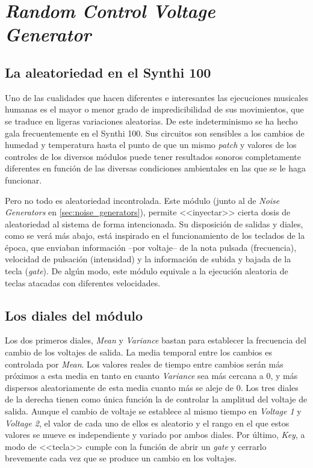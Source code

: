 \section[Random C. V. Generator]{\textit{Random Control Voltage Generator}}
\label{sec:random_generator}

\subsection{La aleatoriedad en el Synthi 100}
Uno de las cualidades que hacen diferentes e interesantes las ejecuciones musicales humanas es el mayor o menor grado de impredicibilidad de sus movimientos, que se traduce en ligeras variaciones aleatorias. De este indeterminismo se ha hecho gala frecuentemente en el Synthi 100. Sus circuitos son sensibles a los cambios de humedad y temperatura hasta el punto de que un mismo \textit{patch} y valores de los controles de los diversos módulos puede tener resultados sonoros completamente diferentes en función de las diversas condiciones ambientales en las que se le haga funcionar. 

Pero no todo es aleatoriedad incontrolada. Este módulo (junto al de \textit{Noise Generators} en \ref{sec:noise_generators}), permite <<inyectar>> cierta dosis de aleatoriedad al sistema de forma intencionada. Su disposición de salidas y diales, como se verá más abajo, está inspirado en el funcionamiento de los teclados de la época, que enviaban información --por voltaje-- de la nota pulsada (frecuencia), velocidad de pulsación (intensidad) y la información de subida y bajada de la tecla (\textit{gate}). De algún modo, este módulo equivale a la ejecución aleatoria de teclas atacadas con diferentes velocidades.


\subsection{Los diales del módulo}
Los dos primeros diales, \textit{Mean} y \textit{Variance} bastan para establecer la frecuencia del cambio de los voltajes de salida. La media temporal entre los cambios es controlada por \textit{Mean}. Los valores reales de tiempo entre cambios serán más próximos a esta media en tanto en cuanto \textit{Variance} sea más cercana a 0, y más dispersos aleatoriamente de esta media cuanto más se aleje de 0. Los tres diales de la derecha tienen como única función  la de controlar la amplitud del voltaje de salida. Aunque el cambio de voltaje se establece al mismo tiempo en \textit{Voltage 1} y \textit{Voltage 2}, el valor de cada uno de ellos es aleatorio y el rango en el que estos valores se mueve es independiente y variado por ambos diales. Por último, \textit{Key}, a modo de <<tecla>> cumple con la función de abrir un \textit{gate} y cerrarlo brevemente cada vez que se produce un cambio en los voltajes.

